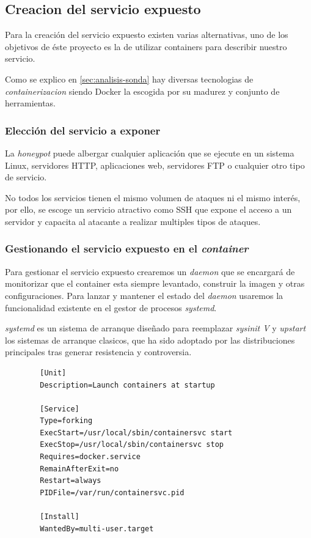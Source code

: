 \subsection{Creacion del servicio expuesto}

Para la creación del servicio expuesto existen varias alternativas, uno de los objetivos de éste proyecto es la de utilizar
containers para describir nuestro servicio.

Como se explico en \ref{sec:analisis-sonda} hay diversas tecnologias de \emph{containerizacion} siendo Docker la escogida
por su madurez y conjunto de herramientas. 

\subsubsection{Elección del servicio a exponer}

La \emph{honeypot} puede albergar cualquier aplicación que se ejecute en un sistema Linux, servidores HTTP, aplicaciones
web, servidores FTP o cualquier otro tipo de servicio.

No todos los servicios tienen el mismo volumen de ataques ni el mismo interés, por ello, se escoge un servicio atractivo como SSH que 
expone el acceso a un servidor y capacita al atacante a realizar multiples tipos de ataques.

\subsubsection{Gestionando el servicio expuesto en el \emph{container}}

Para gestionar el servicio expuesto crearemos un \emph{daemon} que se encargará de monitorizar que el container esta siempre levantado, construir
la imagen y otras configuraciones. Para lanzar y mantener el estado del \emph{daemon} usaremos la funcionalidad existente en el gestor de procesos \emph{systemd}.

\emph{systemd} es un sistema de arranque diseñado para reemplazar \emph{sysinit V} y \emph{upstart} los sistemas de arranque clasicos, que ha sido adoptado
por las distribuciones principales tras generar resistencia y controversia.

    \begin{verbatim}
        [Unit]
        Description=Launch containers at startup
        
        [Service]
        Type=forking
        ExecStart=/usr/local/sbin/containersvc start
        ExecStop=/usr/local/sbin/containersvc stop
        Requires=docker.service
        RemainAfterExit=no
        Restart=always
        PIDFile=/var/run/containersvc.pid
        
        [Install]
        WantedBy=multi-user.target
    \end{verbatim}

